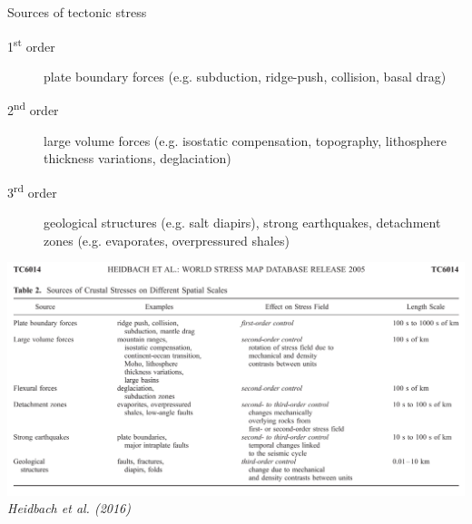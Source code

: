 \documentclass[10pt,xcolor=dvipsnames, aspectratio=169]{beamer}
\begin{document}
 \begin{frame}{Sources of tectonic stress}
 \begin{minipage}{.4\linewidth}
 \small
  \begin{description}
    \item[1\textsuperscript{st} order] plate boundary forces (e.g. subduction, ridge-push, collision, basal drag)
    \item[2\textsuperscript{nd} order] large volume forces (e.g. isostatic compensation, topography, lithosphere thickness variations, deglaciation)
    \item[3\textsuperscript{rd} order] geological structures (e.g. salt diapirs), strong earthquakes, detachment
zones (e.g. evaporates, overpressured shales)
  \end{description}
  \end{minipage}
  \hfill
  \begin{minipage}{.58\linewidth}
      \includegraphics[width=\linewidth]{stress_sources.png}
      \tiny\textit{Heidbach et al. (2016)}
  \end{minipage}  
\end{frame}
\end{document}

